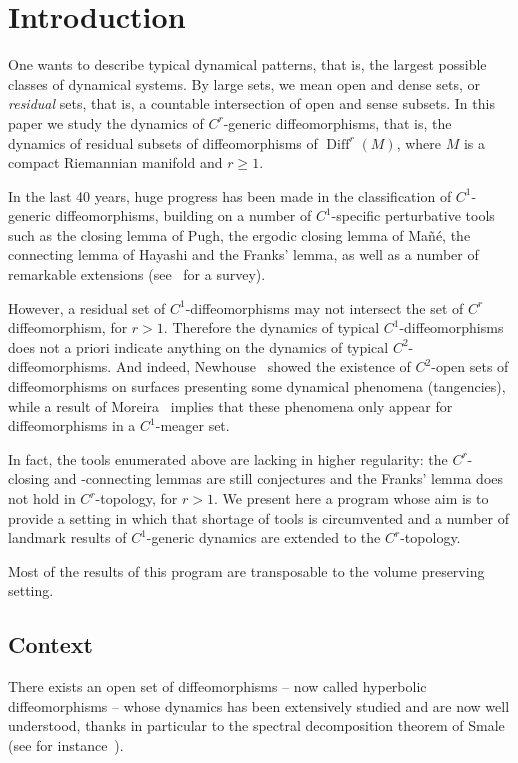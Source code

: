 \documentclass[11pt, a4paper]{amsart}
\theoremstyle{plain}
\theoremstyle{definition}
\theoremstyle{remark}
\numberwithin{equation}{section}         %
\DeclareMathOperator{\Diff}{{Diff}}
\def\Diff{\operatorname{Diff}}
\begin{document}
\maketitle




\section{Introduction}
One wants to describe typical dynamical patterns, that is, the largest possible classes of dynamical systems. By large sets, we mean open and dense sets, or {\em residual} sets, that is, a countable intersection of open and sense subsets. In this paper we study the dynamics of $C^r$-generic diffeomorphisms, that is, the dynamics of residual subsets of diffeomorphisms of $\Diff^r(M)$, where $M$ is a compact Riemannian manifold and $r\geq 1$.

In the last 40 years, huge progress has been made in the classification of $C^1$-generic diffeomorphisms, building on a number of $C^1$-specific perturbative tools such as the closing lemma of Pugh, the ergodic closing lemma of Ma\~n\'e, the connecting lemma of Hayashi and the Franks' lemma, as well as a number of remarkable extensions (see~\cite{C1} for a survey). 

However, a residual set of $C^1$-diffeomorphisms may not intersect the set of $C^r$ diffeomorphism, for $r>1$. Therefore the dynamics of typical $C^1$-diffeomorphisms does not a priori indicate anything on the dynamics of typical $C^2$-diffeomorphisms. And indeed, Newhouse~\cite{N1} showed the existence of $C^2$-open sets of diffeomorphisms on surfaces presenting some dynamical phenomena (tangencies), while a result of Moreira~\cite{Mo} implies that these phenomena only appear for diffeomorphisms in a $C^1$-meager set.

In fact, the tools enumerated above are lacking in higher regularity: the $C^r$-closing and -connecting lemmas are still conjectures and the Franks' lemma does not hold in $C^r$-topology, for $r>1$. We present here a program whose aim is to provide a setting in which that shortage of tools is circumvented and a number of landmark results of $C^1$-generic dynamics are extended to the $C^r$-topology.
\medskip

Most of the results of this program are transposable to the volume preserving setting. 
\medskip

\subsection{Context} There exists an open set of diffeomorphisms -- now called hyperbolic diffeomorphisms -- whose dynamics has been extensively studied and are now well understood, thanks in particular to the spectral decomposition theorem of Smale (see for instance~\cite{BDV}).
\end{document}
